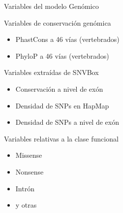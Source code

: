 \documentclass[
  spanish,
  ignorenonframetext,
]{beamer}
\providecommand{\tightlist}{%
  \setlength{\itemsep}{0pt}\setlength{\parskip}{0pt}}
\begin{document}
\begin{frame}{Variables del modelo Genómico}
\protect\hypertarget{variables-del-modelo-genuxf3mico}{}

\begin{block}{Variables de conservación genómica}

\begin{itemize}
\tightlist
\item
  PhastCons a 46 vías (vertebrados)
\item
  PhyloP a 46 vías (vertebrados)
\end{itemize}

\end{block}

\begin{block}{Variables extraídas de SNVBox}

\begin{itemize}
\tightlist
\item
  Conservación a nivel de exón
\item
  Densidad de SNPs en HapMap
\item
  Densidad de SNPs a nivel de exón
\end{itemize}

\end{block}

\begin{block}{Variables relativas a la clase funcional}

\begin{itemize}
\tightlist
\item
  Missense
\item
  Nonsense
\item
  Intrón
\item
  y otras
\end{itemize}

\end{block}

\end{frame}
\end{document}
